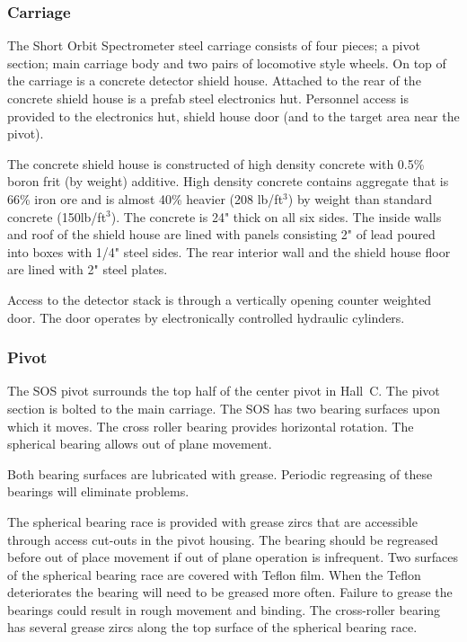 \subsubsection{Carriage}

The Short Orbit Spectrometer steel carriage consists of four pieces; a pivot
section; main carriage body and two pairs of locomotive style wheels. On
top of the carriage is a concrete detector shield house. Attached to the rear
of the concrete shield house is a prefab steel electronics hut. Personnel
access is provided to the electronics hut, shield house door (and to the
target area near the pivot).

The concrete shield house is constructed of high density concrete with
0.5\% boron frit (by weight) additive. High density concrete contains
aggregate that is 66\% iron ore and is almost 40\% heavier (208 lb/ft$^3$) by
weight than standard concrete (150lb/ft$^3$). The concrete is 24" thick on all
six sides. The inside walls and roof of the shield house are lined with panels
consisting 2" of lead poured into boxes with 1/4" steel sides. The rear
interior wall and the shield house floor are lined with 2" steel plates.

Access to the detector stack is through a vertically opening counter
weighted door. The door operates by electronically controlled hydraulic
cylinders.

\subsubsection{Pivot}

The SOS pivot surrounds the top half of the center pivot in Hall~C. The
pivot section is bolted to the main carriage. The SOS has two bearing
surfaces upon which it moves. The cross roller bearing provides horizontal
rotation. The spherical bearing allows out of plane movement.

Both bearing surfaces are lubricated with grease. Periodic regreasing of
these bearings will eliminate problems.

The spherical bearing race is provided with grease zircs that are accessible
through access cut-outs in the pivot housing. The bearing should be
regreased before out of place movement if out of plane operation is infrequent.
Two surfaces of the spherical bearing race are covered with Teflon
film. When the Teflon deteriorates the bearing will need to be greased more
often. Failure to grease the bearings could result in rough movement and
binding. The cross-roller bearing has several grease zircs along the top
surface of the spherical bearing race.

